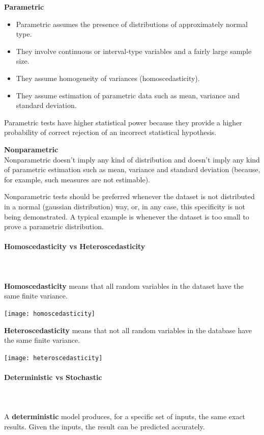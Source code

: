 \documentclass{article}
\begin{document}
\textbf{Parametric}
\begin{itemize}
    \item Parametric assumes the presence of distributions of approximately normal type.
    \item They involve continuous or interval-type variables and a fairly large sample size.
    \item They assume homogeneity of variances (homoscedasticity).
    \item They assume estimation of parametric data such as mean, variance and standard deviation.
\end{itemize}

Parametric tests have higher statistical power because they provide a higher probability of correct rejection of an incorrect statistical hypothesis. 

\textbf{Nonparametric}\mbox{} \\
Nonparametric doesn’t imply any kind of distribution and doesn’t imply any kind of parametric estimation such as mean, variance and standard deviation (because, for example, such measures are not estimable).

Nonparametric tests should be preferred whenever the dataset is not distributed in a normal (gaussian distribution) way, or, in any case, this specificity is not being demonstrated. A typical example is whenever the dataset is too small to prove a parametric distribution.

\paragraph{Homoscedasticity vs Heteroscedasticity}\mbox{} \\ 
\mbox{} \\

\textbf{Homoscedasticity} means that all random variables in the dataset have the same finite variance.

\texttt{[image: homoscedasticity]}

\textbf{Heteroscedasticity}  means that not all random variables in the database have the same finite variance.

\texttt{[image: heteroscedasticity]}

\paragraph{Deterministic vs Stochastic}\mbox{} \\ 
\mbox{} \\
A \textbf{deterministic} model produces, for a specific set of inputs, the same exact results. Given the inputs, the result can be predicted accurately.
\end{document}
